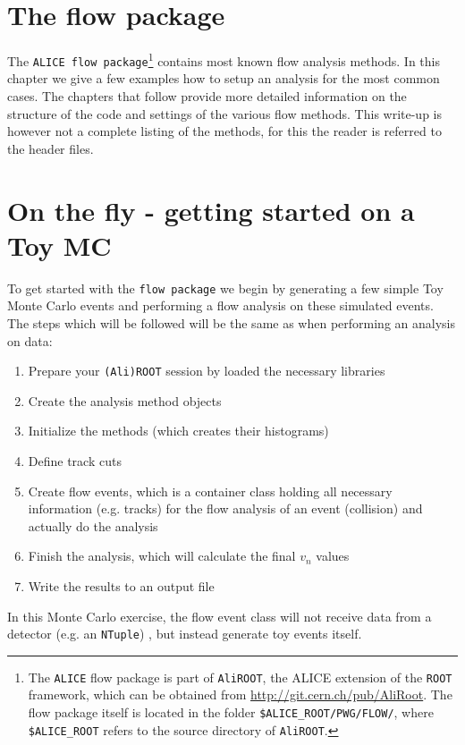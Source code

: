 \documentclass[a5paper]{book}
\numberwithin{equation}{subsection}
\begin{document}
\section{The flow package}
\label{quickstart}
The \texttt{ALICE flow package}\footnote{The \texttt{ALICE} flow package is part of \texttt{AliROOT}, the ALICE extension of the \texttt{ROOT} framework, which can be obtained from \href{http://git.cern.ch/pub/AliRoot}{http://git.cern.ch/pub/AliRoot}. The flow package itself is located in the folder \texttt{\$ALICE\_ROOT/PWG/FLOW/}, where \texttt{\$ALICE\_ROOT} refers to the source directory of \texttt{AliROOT}.} 
contains most known flow analysis methods.  In this chapter we give a few examples how to setup an
analysis for the most common cases. The chapters that follow provide more detailed information on the structure of the code 
and settings of the various flow methods. 
This write-up is however not a complete listing of the methods, for this the reader is referred to the header files.
 
\section{On the fly - getting started on a Toy MC}
To get started with the \texttt{flow package} we begin by generating a few simple Toy Monte Carlo events and performing a flow analysis on these simulated events. The steps which will be followed will be the same as when performing an analysis on data: 
\begin{enumerate}
\item Prepare your \texttt{(Ali)ROOT} session by loaded the necessary libraries
\item Create the analysis method objects
\item Initialize the methods (which creates their histograms)
\item Define track cuts
\item Create flow events, which is a container class holding all necessary information (e.g. tracks) for the flow analysis of an event (collision) and actually do the analysis
\item Finish the analysis, which will calculate the final $v_n$ values
\item Write the results to an output file
\end{enumerate}
In this Monte Carlo exercise, the flow event class will not receive data from a detector (e.g. an \texttt{NTuple}) , but instead generate toy events itself. 
\end{document}
